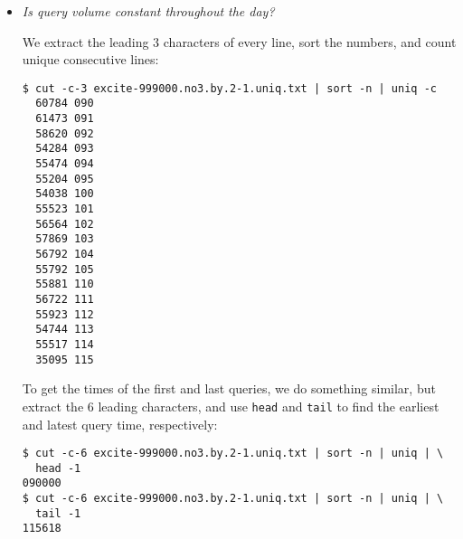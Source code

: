 \begin{itemize}
\item \emph{Is query volume constant throughout the day?}

We extract the leading 3 characters of every line, sort the numbers, and count
unique consecutive lines:

\begin{lstlisting}
$ cut -c-3 excite-999000.no3.by.2-1.uniq.txt | sort -n | uniq -c
  60784 090
  61473 091
  58620 092
  54284 093
  55474 094
  55204 095
  54038 100
  55523 101
  56564 102
  57869 103
  56792 104
  55792 105
  55881 110
  56722 111
  55923 112
  54744 113
  55517 114
  35095 115
\end{lstlisting}

To get the times of the first and last queries, we do something similar, but
extract the 6 leading characters, and use \texttt{head} and \texttt{tail} to
find the earliest and latest query time, respectively:

\begin{lstlisting}
$ cut -c-6 excite-999000.no3.by.2-1.uniq.txt | sort -n | uniq | \
  head -1
090000
$ cut -c-6 excite-999000.no3.by.2-1.uniq.txt | sort -n | uniq | \
  tail -1
115618
\end{lstlisting}

\end{itemize}

